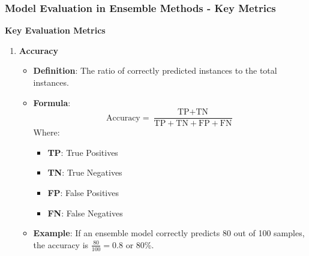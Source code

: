 \documentclass[aspectratio=169]{beamer}
\begin{document}
\begin{frame}[fragile]
    \frametitle{Model Evaluation in Ensemble Methods - Key Metrics}
    \textbf{Key Evaluation Metrics}

    \begin{enumerate}
        \item \textbf{Accuracy}
        \begin{itemize}
            \item \textbf{Definition}: The ratio of correctly predicted instances to the total instances.
            \item \textbf{Formula}:
            \begin{equation}
                \text{Accuracy} = \frac{\text{TP} + \text{TN}}{\text{TP} + \text{TN} + \text{FP} + \text{FN}}
            \end{equation}
            Where:
            \begin{itemize}
                \item \textbf{TP}: True Positives
                \item \textbf{TN}: True Negatives
                \item \textbf{FP}: False Positives
                \item \textbf{FN}: False Negatives
            \end{itemize}
            \item \textbf{Example}: If an ensemble model correctly predicts 80 out of 100 samples, the accuracy is \( \frac{80}{100} = 0.8 \) or 80\%.
        \end{itemize}


\end{enumerate}
\end{frame}
\end{document}
